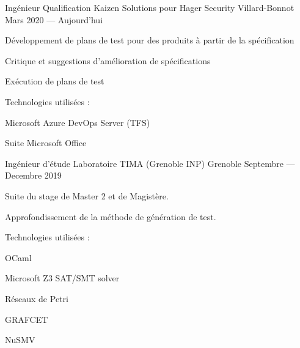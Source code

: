 


\begin{cventries}


\cventry
{Ingénieur Qualification} %
{Kaizen Solutions pour Hager Security} %
{Villard-Bonnot} %
{Mars 2020 --- Aujourd'hui} %
{ %
  \begin{cvitems}
  \item Développement de plans de test pour des produits à partir de la spécification
  \item Critique et suggestions d'amélioration de spécifications
  \item Exécution de plans de test
  \item Technologies utilisées :
    \vspace{.4cm}
    \begin{cvitems}
    \item Microsoft Azure DevOps Server (TFS)
    \item Suite Microsoft Office
    \end{cvitems}
    \vspace{.4cm}
  \end{cvitems}
}

\cventry
{Ingénieur d'étude} %
{Laboratoire TIMA (Grenoble INP)} %
{Grenoble} %
{Septembre --- Decembre 2019} %
{ %
\begin{cvitems}
\item Suite du stage de Master 2 et de Magistère.
\item Approfondissement de la méthode de génération de test.
\item Technologies utilisées :
  \vspace{.4cm}
  \begin{cvitems}
    \item OCaml
    \item Microsoft Z3 SAT/SMT solver
    \item Réseaux de Petri
    \item GRAFCET
    \item NuSMV
  \end{cvitems}
\end{cvitems}
}


\end{cventries}
